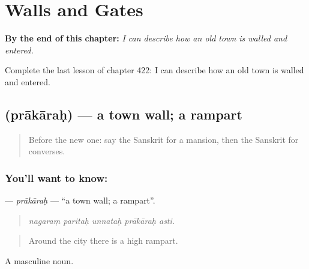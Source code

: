 
\chapter{Walls and Gates}
\label{ch:sa-walls-and-gates}

\begin{chapteropening}
\textbf{By the end of this chapter:} \emph{I can describe how an old town is walled and entered.}

Complete the last lesson of chapter 422: I can describe how an old town is walled and entered.
\end{chapteropening}

\section[\texorpdfstring{\sk{प्राकारः} (prākāraḥ)}{प्राकारः (prākāraḥ)}]{ (prākāraḥ) — a town wall; a rampart}

\label{lesson:SA-C422-prakarah}



\begin{quote}
Before the new one: say the Sanskrit for a mansion, then the Sanskrit for converses.
\end{quote}

\subsection*{You'll want to know: }
\textbf{} — \emph{prākāraḥ} — \textquotedblleft{}a town wall; a rampart\textquotedblright{}.

\begin{quote}
    
\end{quote}

\begin{quote}
\emph{nagaraṃ paritaḥ unnataḥ prākāraḥ asti.}
\end{quote}

\begin{quote}
Around the city there is a high rampart.
\end{quote}

A masculine noun.


